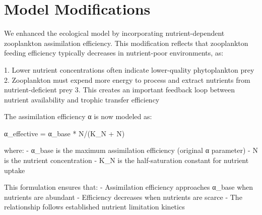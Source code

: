 \section{Model Modifications}

We enhanced the ecological model by incorporating nutrient-dependent zooplankton assimilation efficiency. This modification reflects that zooplankton feeding efficiency typically decreases in nutrient-poor environments, as:

1. Lower nutrient concentrations often indicate lower-quality phytoplankton prey
2. Zooplankton must expend more energy to process and extract nutrients from nutrient-deficient prey
3. This creates an important feedback loop between nutrient availability and trophic transfer efficiency

The assimilation efficiency α is now modeled as:

α_effective = α_base * N/(K_N + N)

where:
- α_base is the maximum assimilation efficiency (original α parameter)
- N is the nutrient concentration
- K_N is the half-saturation constant for nutrient uptake

This formulation ensures that:
- Assimilation efficiency approaches α_base when nutrients are abundant
- Efficiency decreases when nutrients are scarce
- The relationship follows established nutrient limitation kinetics
